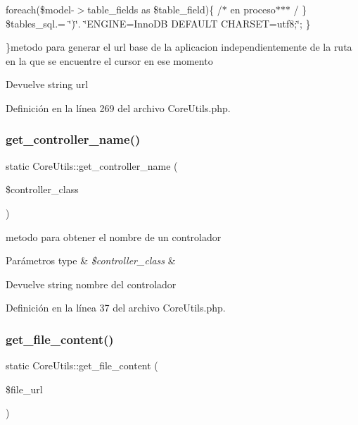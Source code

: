 foreach(\$model-\/$>$table\+\_\+fields as \$table\+\_\+field)\{ /$\ast$ en proceso$\ast$$\ast$$\ast$ / \} \$tables\+\_\+sql.= \char`\"{})\char`\"{}. \char`\"{}\+E\+N\+G\+I\+N\+E=\+Inno\+D\+B D\+E\+F\+A\+U\+L\+T C\+H\+A\+R\+S\+E\+T=utf8;\char`\"{}; \}

\}metodo para generar el url base de la aplicacion independientemente de la ruta en la que se encuentre el cursor en ese momento

\begin{DoxyReturn}{Devuelve}
string url 
\end{DoxyReturn}


Definición en la línea 269 del archivo Core\+Utils.\+php.

\mbox{\label{class_core_utils_ada9d6950d7ad8d0199d823939b727479}} 
\subsubsection{\texorpdfstring{get\_controller\_name()}{get\_controller\_name()}}
{\footnotesize\ttfamily static Core\+Utils\+::get\+\_\+controller\+\_\+name (\begin{DoxyParamCaption}\item[{}]{\$controller\+\_\+class }\end{DoxyParamCaption})\hspace{0.3cm}{\ttfamily [static]}}

metodo para obtener el nombre de un controlador


\begin{DoxyParams}[1]{Parámetros}
type & {\em \$controller\+\_\+class} & \\
\hline
\end{DoxyParams}
\begin{DoxyReturn}{Devuelve}
string nombre del controlador 
\end{DoxyReturn}


Definición en la línea 37 del archivo Core\+Utils.\+php.

\mbox{\label{class_core_utils_a53e64d1ce4c4369cdc8bf4176ebce031}} 
\subsubsection{\texorpdfstring{get\_file\_content()}{get\_file\_content()}}
{\footnotesize\ttfamily static Core\+Utils\+::get\+\_\+file\+\_\+content (\begin{DoxyParamCaption}\item[{}]{\$file\+\_\+url }\end{DoxyParamCaption})\hspace{0.3cm}{\ttfamily [static]}}


